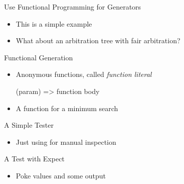 \begin{frame}[fragile]{Use Functional Programming for Generators}
\begin{itemize}
\item This is a simple example
\item What about an arbitration tree with fair arbitration?
\end{itemize}
\end{frame}

\begin{frame}[fragile]{Functional Generation}
\begin{itemize}
\item Anonymous functions, called \emph{function literal}
\begin{chisel}
  (param) => function body
\end{chisel}
\item A function for a minimum search
\end{itemize}
\end{frame}




\begin{frame}[fragile]{A Simple Tester}
\begin{itemize}
\item Just using  for manual inspection
\end{itemize}
\end{frame}


\begin{frame}[fragile]{A Test with Expect}
\begin{itemize}
\item Poke values and  some output
\end{itemize}
\end{frame}

%


